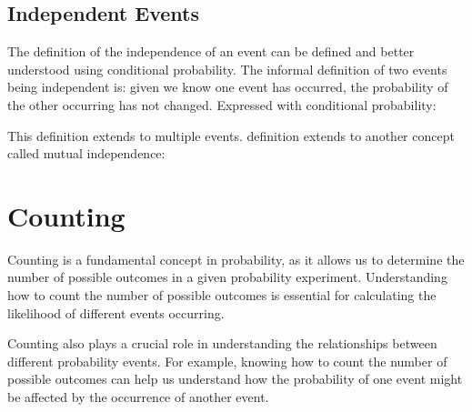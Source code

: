 \documentclass{report}
\begin{document}
        \section{Independent Events}
        The definition of the independence of an event can be defined and better understood using conditional probability. The informal definition of two events being independent is: given we know one event has occurred, the probability of the other occurring has not changed. Expressed with conditional probability:

        This definition extends to multiple events. definition extends to another concept called mutual independence:




    \chapter{Counting}
    Counting is a fundamental concept in probability, as it allows us to determine the number of possible outcomes in a given probability experiment. Understanding how to count the number of possible outcomes is essential for calculating the likelihood of different events occurring.

    Counting also plays a crucial role in understanding the relationships between different probability events. For example, knowing how to count the number of possible outcomes can help us understand how the probability of one event might be affected by the occurrence of another event.
    
\end{document}
